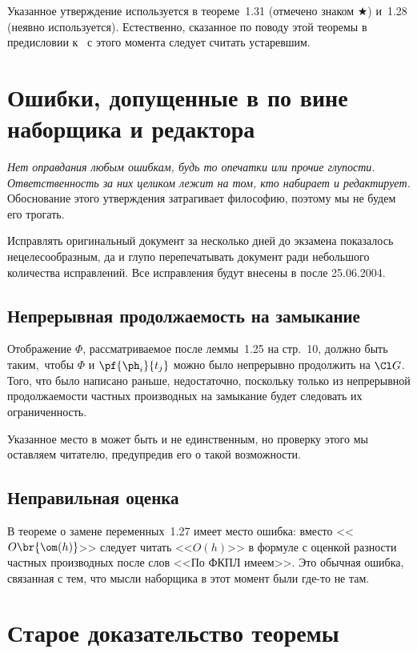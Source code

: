 \documentclass[a4paper]{article}
\begin{document}
Указанное утверждение используется в теореме~1.31 (отмечено знаком $\bigstar$) и~1.28 (неявно используется).
Естественно, сказанное по поводу этой теоремы в предисловии к~\cite{lectures} с этого момента
следует считать устаревшим.

\section{Ошибки, допущенные в \cite{lectures} по вине наборщика и редактора}

\emph{Нет оправдания любым ошибкам, будь то опечатки или прочие глупости. Ответственность за
них целиком лежит на том, кто набирает и редактирует.} Обоснование этого утверждения
затрагивает философию, поэтому мы не будем его трогать.

Исправлять оригинальный документ за несколько дней до экзамена показалось нецелесообразным,
да и глупо перепечатывать документ ради небольшого количества исправлений. Все исправления
будут внесены в \cite{lectures} после 25.06.2004.

\subsection{Непрерывная продолжаемость на замыкание}

Отображение $\Phi$, рассматриваемое после леммы~1.25 на стр.~10, должно быть таким,\
чтобы $\Phi$ и $\pf{\ph_i}{t_j}$ можно было непрерывно продолжить на $\Cl G$. Того, что
было написано раньше, недостаточно, поскольку только из непрерывной продолжаемости
частных производных на замыкание будет следовать их ограниченность.

Указанное место в \cite{lectures} может быть и не единственным, но проверку этого мы оставляем читателю,
предупредив его о такой возможности.

\subsection{Неправильная оценка}

В теореме о замене переменных~1.27 имеет место ошибка: вместо <<$O\br{\om(h)}$>>
следует читать <<$O(h)$>> в формуле с оценкой разности частных производных после слов
<<По ФКПЛ имеем>>. Это обычная ошибка, связанная с тем, что мысли наборщика в этот момент
были где-то не там.

\section{Старое доказательство теоремы}
\end{document}
